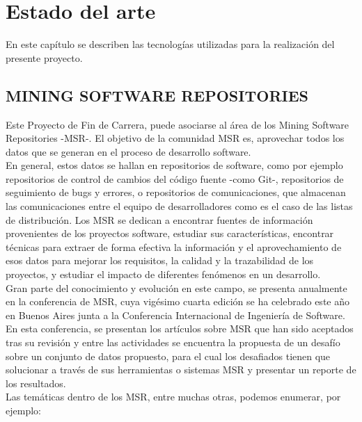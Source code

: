 \cleardoublepage
\chapter{Estado del arte}


En este capítulo se describen las tecnologías utilizadas para la realización del presente proyecto.


\section{MINING SOFTWARE REPOSITORIES}

Este Proyecto de Fin de Carrera, puede asociarse al área de los Mining Software Repositories -MSR-. El objetivo de la comunidad MSR es, aprovechar todos los datos que se generan en el proceso de desarrollo software.\\


En general, estos datos se hallan en repositorios de software, como por ejemplo repositorios de control de cambios del código fuente -como Git-, repositorios de seguimiento de bugs y errores,  o repositorios de comunicaciones, que almacenan las comunicaciones entre el equipo de desarrolladores como es el caso de las listas de distribución. Los MSR se dedican a encontrar fuentes de información provenientes de los proyectos software, estudiar sus características, encontrar técnicas para extraer de forma efectiva la información y el aprovechamiento de esos datos para mejorar los requisitos, la calidad y la trazabilidad de los proyectos, y estudiar el impacto de diferentes fenómenos en un desarrollo.\\


Gran parte del conocimiento y evolución en este campo, se presenta anualmente en la conferencia de MSR, cuya vigésimo cuarta edición se ha celebrado este año en Buenos Aires junta a la Conferencia Internacional de Ingeniería de Software.\\


En esta conferencia, se presentan los artículos sobre MSR que han sido aceptados tras su revisión y entre las actividades se encuentra la propuesta de un desafío sobre un conjunto de datos propuesto, para el cual los desafiados tienen que solucionar a través de sus herramientas o sistemas MSR y presentar un reporte de los resultados.\\


Las temáticas dentro de los MSR, entre muchas otras, podemos enumerar, por ejemplo:\\


